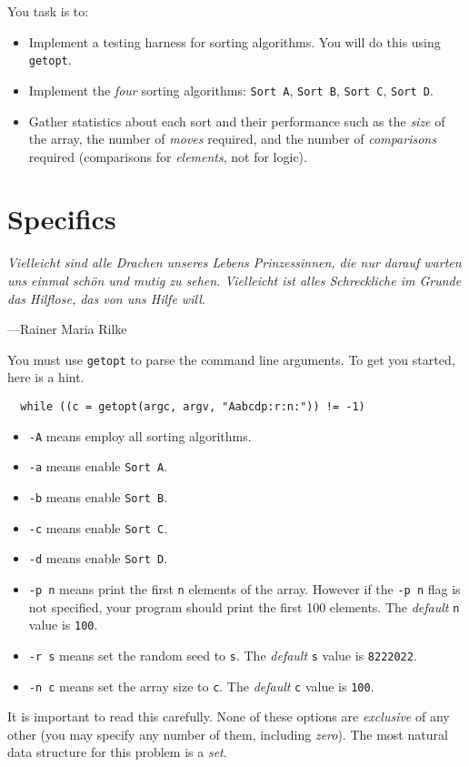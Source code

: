 \documentclass{article}
\begin{document}
You task is to:
\begin{itemize}
\item
Implement a testing harness for sorting algorithms. You will do this using
\texttt{getopt}.

\item Implement the \emph{four} sorting algorithms: \texttt{Sort A}, \texttt{Sort B}, \texttt{Sort C}, \texttt{Sort D}.
\item Gather statistics about each sort and their performance such as the \emph{size} of the array, the number of \emph{moves} required, and the number of \emph{comparisons} required (comparisons for \emph{elements}, not for logic).
\end{itemize}


\section{Specifics}
\epigraph{\emph{Vielleicht sind alle Drachen unseres Lebens Prinzessinnen, die
nur darauf warten uns einmal sch\"on und mutig zu sehen. Vielleicht ist alles
Schreckliche im Grunde das Hilflose, das von uns Hilfe will.}}{---Rainer Maria
Rilke}

You must use \texttt{getopt} to parse the command line arguments. To get you
started, here is a hint.
\begin{lstlisting}
  while ((c = getopt(argc, argv, "Aabcdp:r:n:")) != -1)
\end{lstlisting}
\begin{itemize}
  \item \texttt{-A} means employ all sorting algorithms.
  \item \texttt{-a} means enable \texttt{Sort A}.
  \item \texttt{-b} means enable \texttt{Sort B}.
  \item \texttt{-c} means enable \texttt{Sort C}.
  \item \texttt{-d} means enable \texttt{Sort D}.
  \item \texttt{-p n} means print the first \texttt{n} elements of the array. However if the \texttt{-p n} flag is not specified, your program should print the first 100 elements.
  The \emph{default} \texttt{n} value is \texttt{100}.
  \item \texttt{-r s} means set the random seed to \texttt{s}. The
  \emph{default} \texttt{s} value is \texttt{8222022}.
  \item \texttt{-n c} means set the array size to \texttt{c}.
  The \emph{default} \texttt{c} value is \texttt{100}.
\end{itemize}
It is important to read this carefully. None of these options are
\emph{exclusive} of any other (you may specify any number of them,
including \emph{zero}). The most natural data structure for this
problem is a \emph{set}.
\end{document}
